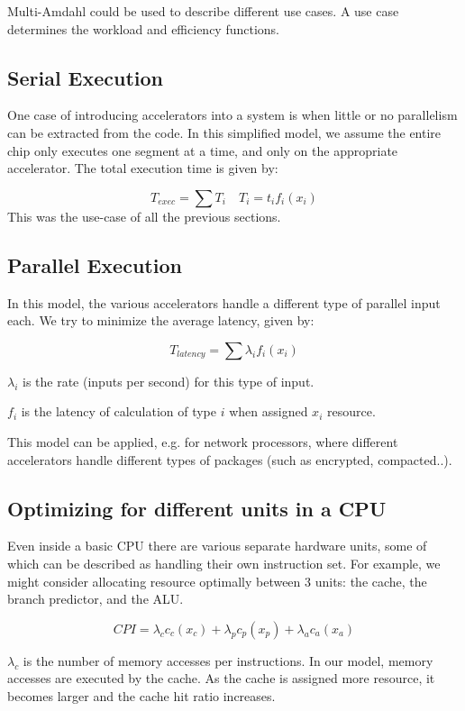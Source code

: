 \documentclass[twocolumn,english]{IEEEtran}
\begin{document}
Multi-Amdahl could be used to describe different use cases. A use
case determines the workload and efficiency functions.


\subsection{Serial Execution}

One case of introducing accelerators into a system is when little
or no parallelism can be extracted from the code. In this simplified
model, we assume the entire chip only executes one segment at a time,
and only on the appropriate accelerator. The total execution time
is given by:

\[
T_{exec}=\sum T_{i}\quad T_{i}=t_{i}f_{i}(x_{i})\]
This was the use-case of all the previous sections.


\subsection{\label{sub:use-ser}Parallel Execution}



In this model, the various accelerators handle a different type of
parallel input each. We try to minimize the average latency, given
by:

\[
T_{latency}=\sum\lambda_{i}f_{i}(x_{i})\]


$\lambda_{i}$ is the rate (inputs per second) for this type of input.

$f_{i}$ is the latency of calculation of type $i$ when assigned
$x_{i}$ resource.

This model can be applied, e.g. for network processors, where different
accelerators handle different types of packages (such as encrypted,
compacted..).




\subsection{Optimizing for different units in a CPU}

Even inside a basic CPU there are various separate hardware units,
some of which can be described as handling their own instruction set.
For example, we might consider allocating resource optimally between
3 units: the cache, the branch predictor, and the ALU.

\[
CPI=\lambda_{c}c_{c}(x_{c})+\lambda_{p}c_{p}(x_{p})+\lambda_{a}c_{a}(x_{a})\]


$\lambda_{c}$ is the number of memory accesses per instructions.
In our model, memory accesses are executed by the cache. As the cache
is assigned more resource, it becomes larger and the cache hit ratio
increases.
\end{document}

